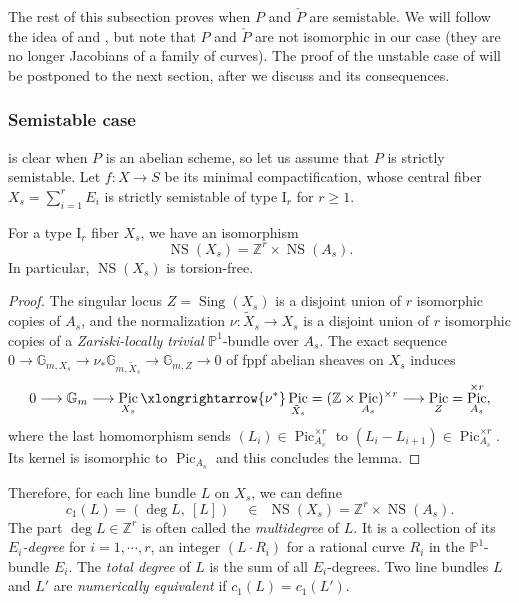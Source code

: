 \documentclass[reqno, letterpaper]{amsart}
\numberwithin{equation}{subsection}
\let\to\longrightarrow
\newcommand{\GG}{\mathbb{G}}
\newcommand{\PP}{\mathbb{P}}
\newcommand{\ZZ}{\mathbb{Z}}
\DeclareMathOperator{\Pic}{Pic}
\DeclareMathOperator{\NS}{NS}
\DeclareMathOperator{\Sing}{Sing}
\begin{document}
		The rest of this subsection proves  when $P$ and $\check P$ are semistable. We will follow the idea of \cite[Theorem~9.6.1]{neron} and \cite[\S 10.4.2]{liu:ag}, but note that $P$ and $\check P$ are not isomorphic in our case (they are no longer Jacobians of a family of curves). The proof of the unstable case of  will be postponed to the next section, after we discuss  and its consequences.
		
		
		
		\subsubsection{Semistable case}
			 is clear when $P$ is an abelian scheme, so let us assume that $P$ is strictly semistable. Let $f : X \to S$ be its minimal compactification, whose central fiber $X_s = \sum_{i=1}^r E_i$ is strictly semistable of type $\mathrm I_r$ for $r \ge 1$.
			
			\begin{lemma} \label{lem:classification of component group:semistable NS}
				For a type $\mathrm I_r$ fiber $X_s$, we have an isomorphism
				\[ \NS(X_s) = \ZZ^r \times \NS(A_s) .\]
				In particular, $\NS(X_s)$ is torsion-free.
			\end{lemma}
			\begin{proof}
				The singular locus $Z = \Sing(X_s)$ is a disjoint union of $r$ isomorphic copies of $A_s$, and the normalization $\nu : \tilde X_s \to X_s$ is a disjoint union of $r$ isomorphic copies of a \emph{Zariski-locally trivial} $\PP^1$-bundle over $A_s$. The exact sequence $0 \to \GG_{m, X_s} \to \nu_* \GG_{m, \tilde X_s} \to \GG_{m, Z} \to 0$ of fppf abelian sheaves on $X_s$ induces
				\[ 0 \to \GG_m \to \Pic_{X_s} \xlongrightarrow{\nu^*} \Pic_{\tilde X_s} = (\ZZ \times \Pic_{A_s})^{\times r} \to \Pic_Z = \Pic_{A_s}^{\times r} ,\]
				where the last homomorphism sends $(L_i) \in \Pic_{A_s}^{\times r}$ to $(L_i - L_{i+1}) \in \Pic_{A_s}^{\times r}$. Its kernel is isomorphic to $\Pic_{A_s}$ and this concludes the lemma.
			\end{proof}
			
			Therefore, for each line bundle $L$ on $X_s$, we can define
			\[ c_1(L) = (\deg L, \ [L]) \quad \in \ \ \NS(X_s) = \ZZ^r \times \NS(A_s) .\]
			The part $\deg L \in \ZZ^r$ is often called the \emph{multidegree} of $L$. It is a collection of its \emph{$E_i$-degree} for $i = 1, \cdots, r$, an integer $(L \cdot R_i)$ for a rational curve $R_i$ in the $\PP^1$-bundle $E_i$. The \emph{total degree} of $L$ is the sum of all $E_i$-degrees. Two line bundles $L$ and $L'$ are \emph{numerically equivalent} if $c_1(L) = c_1(L')$.
			
\end{document}
